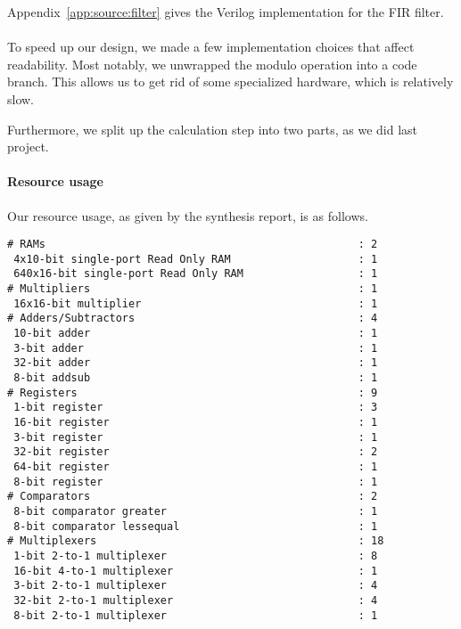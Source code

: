 Appendix~\ref{app:source:filter} gives the Verilog implementation for the FIR filter.

\paragraph{}
To speed up our design, we made a few implementation choices that affect readability.
Most notably, we unwrapped the modulo operation into a code branch.
This allows us to get rid of some specialized hardware, which is relatively slow.

Furthermore, we split up the calculation step into two parts, as we did last project.

\paragraph{Resource usage}
Our resource usage, as given by the synthesis report, is as follows.

\begin{verbatim}
# RAMs                                                 : 2
 4x10-bit single-port Read Only RAM                    : 1
 640x16-bit single-port Read Only RAM                  : 1
# Multipliers                                          : 1
 16x16-bit multiplier                                  : 1
# Adders/Subtractors                                   : 4
 10-bit adder                                          : 1
 3-bit adder                                           : 1
 32-bit adder                                          : 1
 8-bit addsub                                          : 1
# Registers                                            : 9
 1-bit register                                        : 3
 16-bit register                                       : 1
 3-bit register                                        : 1
 32-bit register                                       : 2
 64-bit register                                       : 1
 8-bit register                                        : 1
# Comparators                                          : 2
 8-bit comparator greater                              : 1
 8-bit comparator lessequal                            : 1
# Multiplexers                                         : 18
 1-bit 2-to-1 multiplexer                              : 8
 16-bit 4-to-1 multiplexer                             : 1
 3-bit 2-to-1 multiplexer                              : 4
 32-bit 2-to-1 multiplexer                             : 4
 8-bit 2-to-1 multiplexer                              : 1
\end{verbatim}

